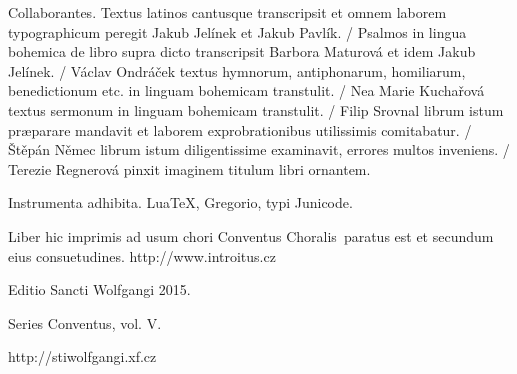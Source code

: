 \documentclass[a4paper, twoside, 12pt]{article}
\newcommand{\annusEditionis}{2015}
\begin{document}
Collaborantes.
Textus latinos cantusque transcripsit et omnem laborem typographicum peregit
Jakub Jelínek et Jakub Pavlík. /
Psalmos in lingua bohemica de libro supra dicto transcripsit
Barbora Maturová et idem Jakub Jelínek. /
Václav Ondráček textus hymnorum, antiphonarum, homiliarum, benedictionum etc.
in linguam bohemicam transtulit. /
Nea Marie Kuchařová textus sermonum in linguam bohemicam transtulit. /
Filip Srovnal librum istum præparare mandavit et laborem exprobrationibus
utilissimis comitabatur. /
Štěpán Němec librum istum diligentissime examinavit, errores multos
inveniens. /
Terezie Regnerová pinxit imaginem titulum libri ornantem.

Instrumenta adhibita.
LuaTeX, %
Gregorio, %
typi Junicode. %

\begin{center}
Liber hic imprimis ad usum chori
\guillemotright Conventus Choralis\guillemotleft\
paratus est
et secundum eius consuetudines.
http://www.introitus.cz

\vfill

{\large Editio Sancti Wolfgangi \annusEditionis.}

\vfill

Series \guillemotright Conventus\guillemotleft, vol. V.

\vfill

http://stiwolfgangi.xf.cz

\end{center}

\vfill
\end{document}
